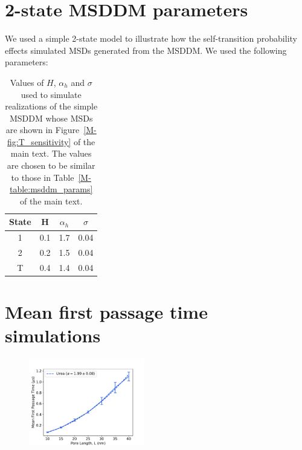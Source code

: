\documentclass{article}
\begin{document}
  \section{2-state MSDDM parameters}\label{section:simple_msddm_params}
  
  We used a simple 2-state model to illustrate how the self-transition probability 
  effects simulated MSDs generated from the MSDDM. We used the following parameters:
  
  \begin{table}[h]
  \centering
  \begin{tabular}{|c|c|c|c|}
  \hline
  State & H     & $\alpha_h$ & $\sigma$ \\\hline
  1     & 0.1  & 1.7       & 0.04    \\
  2     & 0.2  & 1.5       & 0.04    \\
  T     & 0.4  & 1.4       & 0.04    \\\hline
  \end{tabular}
  \caption{Values of $H$, $\alpha_h$ and $\sigma$ used to simulate realizations
  of the simple MSDDM whose MSDs are shown in Figure~\ref{M-fig:T_sensitivity} of
  the main text. The values are chosen to be similar to those in Table~\ref{M-table:msddm_params}
  of the main text.}\label{table:msddm_params}
  \end{table}
  
  \section{Mean first passage time simulations}\label{section:mfpt}
  
  
  \begin{figure}
  \centering
  \includegraphics[width=0.45\textwidth]{mfpt_curves_brownian.pdf}
  \caption{}\label{fig:mfpt_curve_brownian}
  \end{figure}
  

  \clearpage
  
\end{document}
